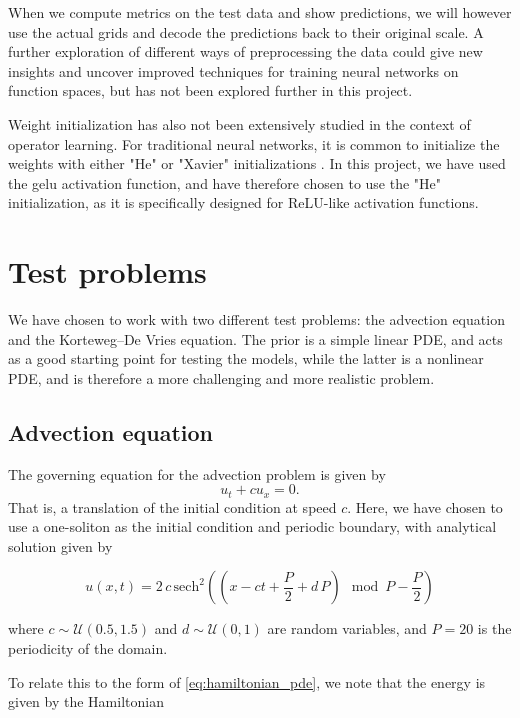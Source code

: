 When we compute metrics on the test data and show predictions, we will however use the actual grids and decode the predictions 
back to their original scale. A further exploration of different ways of preprocessing the data could give new insights and uncover improved techniques for 
training neural networks on function spaces, but has not been explored further in this project.

Weight initialization has also not been extensively studied in the context of operator learning. For traditional neural networks, it is common to initialize the weights with either "He" or "Xavier" initializations .
In this project, we have used the gelu activation function, and have therefore chosen to use the "He" initialization, as it is specifically designed for ReLU-like activation functions. 

\section{Test problems}
We have chosen to work with two different test problems: the advection equation and the Korteweg–De Vries equation. The prior is a simple linear PDE, and acts as a good starting point for testing the models, while the latter is a nonlinear PDE, and is therefore a more challenging and more realistic problem.

\subsection{Advection equation}
The governing equation for the advection problem is given by
\begin{equation}
    u_t + c u_x = 0.
    \label{eq:advection}
\end{equation}
That is, a translation of the initial condition at speed \(c\).
Here, we have chosen to use a one-soliton as the initial condition and periodic boundary, with analytical solution given by

\begin{equation}
    \label{eq:advection_solution}
    u(x,t) = 2 \, c \,\text{sech}^2\left(\left(x - c t + \frac{P}{2} + d\, P\right) \mod P - \frac{P}{2}\right)
\end{equation}

where \(c \sim \mathcal{U}(0.5, 1.5)\) and \(d \sim \mathcal{U}(0, 1)\) are random variables, and \(P=20\) is the periodicity of the domain.

To relate this to the form of \cref{eq:hamiltonian_pde}, we note that the energy is given by the Hamiltonian

